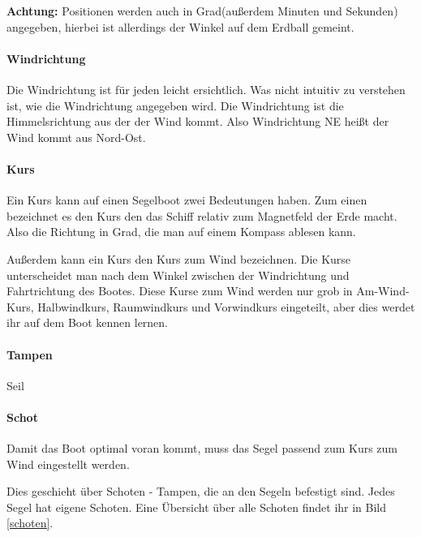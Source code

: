 \documentclass[12pt]{article}
\begin{document}
\textbf{Achtung:} Positionen werden auch in Grad(außerdem Minuten und Sekunden) angegeben, hierbei ist allerdings der Winkel auf dem Erdball gemeint.

\paragraph{Windrichtung}
Die Windrichtung ist für jeden leicht ersichtlich. Was nicht intuitiv zu verstehen ist, wie die Windrichtung angegeben wird. Die Windrichtung ist die Himmelsrichtung aus der der Wind kommt. Also Windrichtung NE heißt der Wind kommt aus Nord-Ost.

\paragraph{Kurs}
Ein Kurs kann auf einen Segelboot zwei Bedeutungen haben. Zum einen bezeichnet es den Kurs den das Schiff relativ zum Magnetfeld der Erde macht. Also die Richtung in Grad, die man auf einem Kompass ablesen kann.

Außerdem kann ein Kurs den Kurs zum Wind bezeichnen. Die Kurse unterscheidet man nach dem Winkel zwischen der Windrichtung und Fahrtrichtung des Bootes. Diese Kurse zum Wind werden nur grob in Am-Wind-Kurs, Halbwindkurs, Raumwindkurs und Vorwindkurs eingeteilt, aber dies werdet ihr auf dem Boot kennen lernen.

\paragraph{Tampen}
Seil

\paragraph{Schot}
Damit das Boot optimal voran kommt, muss das Segel passend zum Kurs zum Wind eingestellt werden.

Dies geschieht über Schoten - Tampen, die an den Segeln befestigt sind. Jedes Segel hat eigene Schoten. Eine Übersicht über alle Schoten findet ihr in Bild \ref{schoten}.
\end{document}
